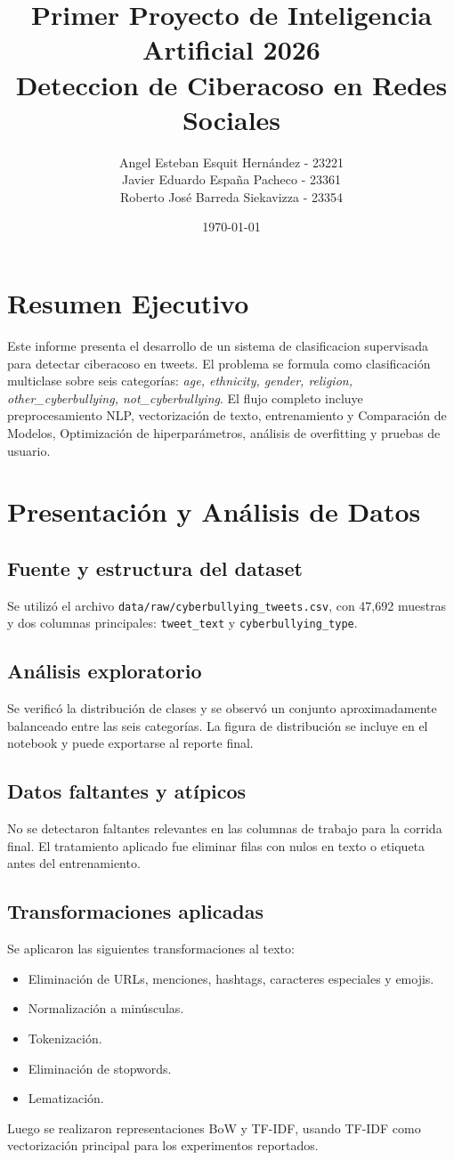 ﻿\documentclass[12pt,a4paper]{article}
\title{\textbf{Primer Proyecto de Inteligencia Artificial 2026}\\
Deteccion de Ciberacoso en Redes Sociales}
\author{Angel Esteban Esquit Hernández - 23221\\
Javier Eduardo España Pacheco - 23361\\
Roberto José Barreda Siekavizza - 23354}
\date{\today}
\begin{document}
\maketitle
\tableofcontents
\newpage

\section{Resumen Ejecutivo}
Este informe presenta el desarrollo de un sistema de clasificacion supervisada para detectar ciberacoso en tweets.
El problema se formula como clasificación multiclase sobre seis categorías: \textit{age, ethnicity, gender, religion,
other\_cyberbullying, not\_cyberbullying}. El flujo completo incluye preprocesamiento NLP, vectorización de texto,
entrenamiento y Comparación de Modelos, Optimización de hiperparámetros, análisis de overfitting y pruebas de usuario.

\section{Presentación y Análisis de Datos}
\subsection{Fuente y estructura del dataset}
Se utilizó el archivo \texttt{data/raw/cyberbullying\_tweets.csv}, con 47,692 muestras y dos columnas principales:
\texttt{tweet\_text} y \texttt{cyberbullying\_type}.

\subsection{Análisis exploratorio}
Se verificó la distribución de clases y se observó un conjunto aproximadamente balanceado entre las seis categorías.
La figura de distribución se incluye en el notebook y puede exportarse al reporte final.

\subsection{Datos faltantes y atípicos}
No se detectaron faltantes relevantes en las columnas de trabajo para la corrida final.
El tratamiento aplicado fue eliminar filas con nulos en texto o etiqueta antes del entrenamiento.

\subsection{Transformaciones aplicadas}
Se aplicaron las siguientes transformaciones al texto:
\begin{itemize}
  \item Eliminación de URLs, menciones, hashtags, caracteres especiales y emojis.
  \item Normalización a minúsculas.
  \item Tokenización.
  \item Eliminación de stopwords.
  \item Lematización.
\end{itemize}
Luego se realizaron representaciones BoW y TF-IDF, usando TF-IDF como vectorización principal para los experimentos reportados.
\end{document}

